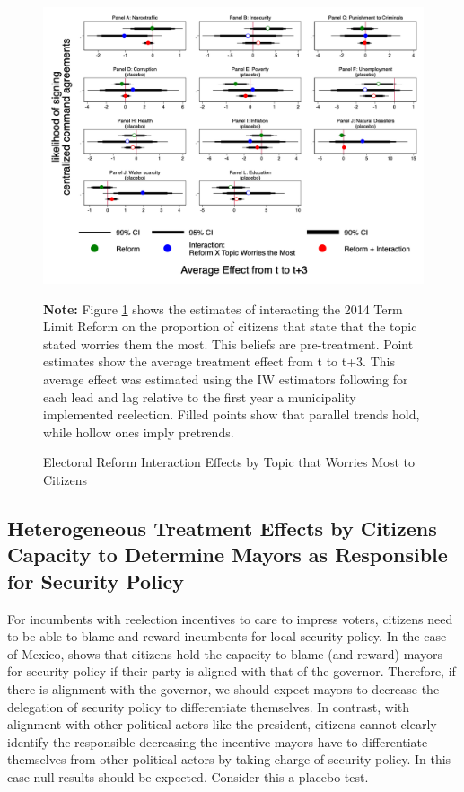 \begin{figure}[h]   
\centering
 \caption{Electoral Reform Interaction Effects by Topic that Worries Most to Citizens}
 \label{fig:preferences_all}
\includegraphics[width=1\textwidth]{Figures/preferences.png}
       \captionsetup{justification=centering}
        
 \textbf{Note:} Figure \ref{fig:preferences_all} shows the estimates of interacting the 2014 Term Limit Reform on the proportion of citizens that state that the topic stated worries them the most. This beliefs are pre-treatment. Point estimates show the average treatment effect from t to t+3. This average effect was estimated using the IW estimators following \citet{abraham_sun_2020} for each lead and lag relative to the first year a municipality implemented reelection. Filled points show that parallel trends hold, while hollow ones imply pretrends.  
\end{figure}    


\subsection{Heterogeneous Treatment Effects by Citizens Capacity to Determine Mayors as Responsible for Security Policy}
  
For incumbents with reelection incentives to care to impress voters, citizens need to be able to blame and reward incumbents for local security policy. In the case of Mexico, \citet{ley_2017} shows that citizens hold the capacity to blame (and reward) mayors for security policy if their party is aligned with that of the governor. Therefore, if there is alignment with the governor, we should expect mayors to decrease the delegation of security policy to differentiate themselves. In contrast, with alignment with other political actors like the president, citizens cannot clearly identify the responsible decreasing the incentive mayors have to differentiate themselves from other political actors by taking charge of security policy. In this case null results should be expected. Consider this a placebo test.
  
